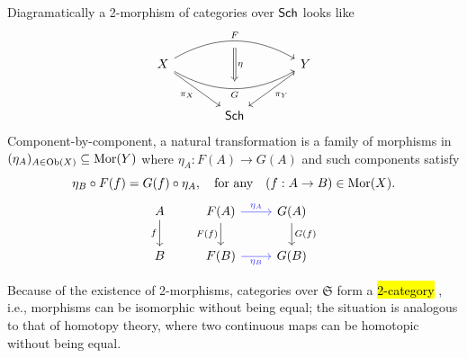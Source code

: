 \documentclass[12pt]{memoir}
\makeatletter
\newcommand{\roundedhighlight}[1]{%
  \begingroup
  \setuloverlap{2pt}%
  \def\SOUL@ulunderline##1{{%
    \setbox\z@\hbox{##1}%
    \rlap{\SOUL@ulcolor{\tikz[overlay,blend mode=darken]{%
      \fill[rounded corners=2pt]
        (-\SOUL@uloverlap,-\SOUL@uldp)
        rectangle (\dimexpr\wd\z@+\SOUL@uloverlap\relax,\SOUL@ulht);%
    }}}%
    \unhcopy\z@
  }}%
  \hl{#1}%
  \endgroup
}
\DeclareRobustCommand{\hlgreen}[1]{{\sethlcolor{notegreen}\roundedhighlight{#1}}}
\makeatother
\begin{document}
\begin{ptcb}
    Diagramatically a 2-morphism of categories over \(\mathsf{Sch}\) looks like 
    \[
    \begin{tikzcd}[column sep=large, row sep=large]
        X
        \arrow[rr, bend left=30, "F"{name=F}]
        \arrow[rr, bend right=30, "G"'{name=G}]
        \arrow[dr, "\pi_X"']
        && Y \arrow[dl, "\pi_Y"] \\
        & \Sch
        \arrow[Rightarrow, from=F, to=G, shorten <=2mm, shorten >=2mm, "\eta"]
    \end{tikzcd}
    \]
    Component-by-component, a natural transformation is a family of morphisms in \((\eta_A)_{A\in\operatorname{Ob}(X)}\subseteq\operatorname{Mor}(Y)\) where
    \(\eta_A:F(A)\to G(A)\) and such components satisfy 
    \[
        \eta_B\circ F(f)=G(f)\circ\eta_A,\quad\text{for any}\quad(f:A\to B)\in\operatorname{Mor}(X).
    \]
    \[
    \begin{tikzcd}
        A \arrow[d, "f"']
        & F(A) \arrow[d, "F(f)"'] \arrow[r, blue!80, "\eta_A"]
        & G(A) \arrow[d, "G(f)"] \\
        B
        & F(B) \arrow[r, blue!80, "\eta_B"']
        & G(B)
    \end{tikzcd}
    \]
\end{ptcb}


Because of the existence of 2-morphisms, categories over $\mathfrak{S}$ form a \hlgreen{2-category}, i.e., morphisms can be isomorphic without being equal; the situation is analogous to that of homotopy theory, where two continuous maps can be homotopic without being equal.
\end{document}
